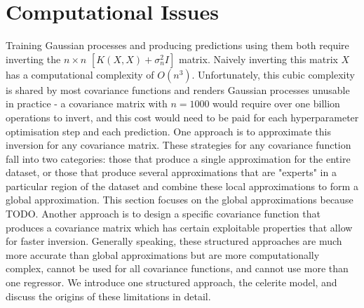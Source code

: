 \section{Computational Issues}
Training Gaussian processes and producing predictions using them both require inverting the $n \times n$ $[K(X,X) + \sigma^2_nI]$ matrix. Naively inverting this matrix $X$ has a computational complexity of $O(n^3)$. Unfortunately, this cubic complexity is shared by most covariance functions and renders Gaussian processes unusable in practice - a covariance matrix with $n = 1000$ would require over one billion operations to invert, and this cost would need to be paid for each hyperparameter optimisation step and each prediction. One approach is to approximate this inversion for any covariance matrix. These strategies for any covariance function fall into two categories: those that produce a single approximation for the entire dataset, or those that produce several approximations that are "experts" in a particular region of the dataset and combine these local approximations to form a global approximation. This section focuses on the global approximations because TODO. Another approach is to design a specific covariance function that produces a covariance matrix which has certain exploitable properties that allow for faster inversion. Generally speaking, these structured approaches are much more accurate than global approximations but are more computationally complex, cannot be used for all covariance functions, and cannot use more than one regressor. We introduce one structured approach, the celerite model, and discuss the origins of these limitations in detail.



